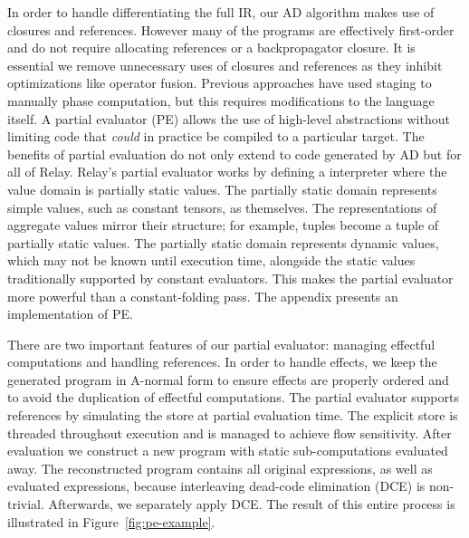 In order to handle differentiating the full IR,
  our AD algorithm makes use of closures and references.
However many of the programs are effectively
  first-order and do not require allocating
  references or a backpropagator closure.
It is essential we remove unnecessary uses
  of closures and references as they inhibit
  optimizations like operator fusion.
Previous approaches have used staging to manually
  phase computation, but this requires modifications
  to the language itself.
A partial evaluator (PE) allows the use of high-level abstractions
  without limiting code that \textit{could} in practice be
  compiled to a particular target.
The benefits of partial evaluation do not only extend to code
  generated by AD but for all of Relay.
Relay's partial evaluator works by defining a interpreter
  where the value domain is partially static values.
The partially static domain represents simple values,
  such as constant tensors, as themselves.
The representations
  of aggregate values mirror their structure; for example,
  tuples become a tuple of partially static values.
The partially static domain represents dynamic values,
  which may not be known until execution time,
  alongside the static values traditionally supported by
  constant evaluators.
This makes the partial evaluator more powerful
  than a constant-folding pass.
The appendix presents an implementation of PE.

There are two important features of our partial evaluator:
  managing effectful computations and handling references.
In order to handle effects, we keep the generated
  program in A-normal form to ensure effects are properly ordered
  and to avoid the duplication of effectful computations.
The partial evaluator supports references by
  simulating the store at partial evaluation time.
The explicit store is threaded throughout execution
  and is managed to achieve flow sensitivity.
After evaluation we construct a new program with
  static sub-computations evaluated
  away.
The reconstructed program contains all original
  expressions, as well as evaluated expressions,
  because interleaving dead-code elimination (DCE) is
  non-trivial.
Afterwards, we separately apply DCE.
The result of this entire process is illustrated
  in Figure~\ref{fig:pe-example}.
